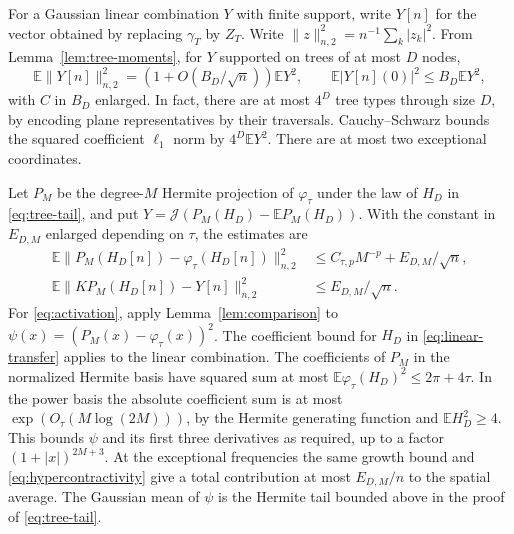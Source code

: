 \documentclass[preprints,article,submit,oneauthor]{Definitions/mdpi}
\newcommand{\E}{\mathbb E}
\newcommand{\abs}[1]{\lvert #1\rvert}
\newcommand{\norm}[1]{\lVert #1\rVert}
\begin{document}
For a Gaussian linear combination \(Y\) with finite support, write
\(Y[n]\) for the vector obtained by replacing \(\gamma_T\) by \(Z_T\).
Write \(\|z\|_{n,2}^2=n^{-1}\sum_k\abs{z_k}^2\). From
Lemma~\ref{lem:tree-moments}, for \(Y\) supported on trees of at most
\(D\) nodes,
\begin{equation}\label{eq:linear-transfer}
 \E\norm{Y[n]}_{n,2}^2=(1+O(B_D/\sqrt n))\E Y^2,
 \qquad \E\abs{Y[n](0)}^2\le B_D\E Y^2,
\end{equation}
with \(C\) in \(B_D\) enlarged. In fact, there are at most \(4^D\) tree
types through size \(D\), by encoding plane representatives by their
traversals. Cauchy--Schwarz bounds the squared coefficient \(\ell_1\) norm
by \(4^D\E Y^2\). There are at most two exceptional coordinates.

Let \(P_M\) be the degree-\(M\) Hermite projection of \(\varphi_\tau\) under
the law of \(H_D\) in \eqref{eq:tree-tail}, and put
\(Y=\mathcal J(P_M(H_D)-\E P_M(H_D))\). With the constant in \(E_{D,M}\)
enlarged depending on \(\tau\), the estimates are
\begin{align}
 \E\norm{P_M(H_D[n])-\varphi_\tau(H_D[n])}_{n,2}^2
   &\le C_{\tau,p} M^{-p}+E_{D,M}/\sqrt n, \label{eq:activation}\\
 \E\norm{K P_M(H_D[n])-Y[n]}_{n,2}^2
   &\le E_{D,M}/\sqrt n. \label{eq:grafting}
\end{align}
For \eqref{eq:activation}, apply Lemma~\ref{lem:comparison} to
\(\psi(x)=(P_M(x)-\varphi_\tau(x))^2\). The coefficient bound for \(H_D\) in
\eqref{eq:linear-transfer} applies to the linear combination. The
coefficients of \(P_M\) in the normalized Hermite basis have squared
sum at most \(\E\varphi_\tau(H_D)^2\le2\pi+4\tau\). In the power basis
the absolute coefficient sum is at most
\(\exp(O_\tau(M\log(2M)))\), by the Hermite generating function and
\(\E H_D^2\ge4\). This bounds \(\psi\) and its first three derivatives as
required, up to a factor \((1+\abs x)^{2M+3}\). At the exceptional
frequencies the same growth bound and \eqref{eq:hypercontractivity}
give a total contribution at most \(E_{D,M}/n\) to the spatial
average. The Gaussian mean of \(\psi\) is the Hermite tail bounded above
in the proof of \eqref{eq:tree-tail}.
\end{document}

